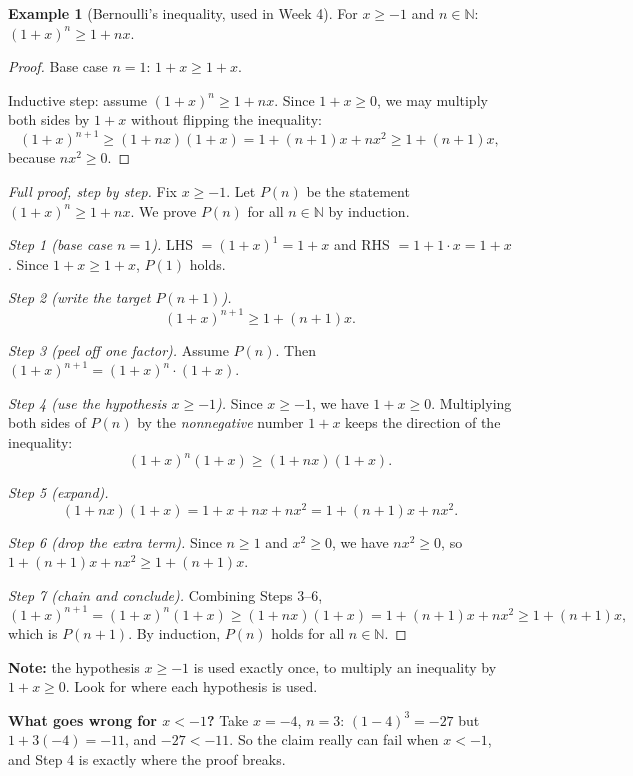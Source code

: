 \documentclass[11pt]{article}
\theoremstyle{definition}
\newtheorem{ex}[defn]{Example}
\newcommand{\N}{\mathbb{N}}
\newcommand{\key}[1]{\textcolor{red!70!black}{\textbf{#1}}}
\begin{document}
\begin{ex}[Bernoulli's inequality, used in Week 4]
For $x\ge -1$ and $n\in\N$: $(1+x)^n\ge 1+nx$.
\begin{proof}
Base case $n=1$: $1+x\ge 1+x$. \checkmark

Inductive step: assume $(1+x)^n\ge 1+nx$. Since $1+x\ge 0$, we may multiply
both sides by $1+x$ without flipping the inequality:
\[
(1+x)^{n+1}\ge(1+nx)(1+x)=1+(n+1)x+nx^2\ge 1+(n+1)x,
\]
because $nx^2\ge 0$.
\end{proof}

\begin{proof}[Full proof, step by step]
Fix $x\ge-1$. Let $P(n)$ be the statement $(1+x)^n\ge1+nx$. We prove $P(n)$
for all $n\in\N$ by induction.

\emph{Step 1 (base case $n=1$).} LHS $=(1+x)^1=1+x$ and RHS $=1+1\cdot x=1+x$.
Since $1+x\ge1+x$, $P(1)$ holds. \checkmark

\emph{Step 2 (write the target $P(n+1)$).}
\[
(1+x)^{n+1}\ge1+(n+1)x.
\]

\emph{Step 3 (peel off one factor).} Assume $P(n)$. Then
$(1+x)^{n+1}=(1+x)^n\cdot(1+x)$.

\emph{Step 4 (use the hypothesis $x\ge-1$).} Since $x\ge-1$, we have
$1+x\ge0$. Multiplying both sides of $P(n)$ by the \emph{nonnegative}
number $1+x$ keeps the direction of the inequality:
\[
(1+x)^n(1+x)\ge(1+nx)(1+x).
\]

\emph{Step 5 (expand).}
\[
(1+nx)(1+x)=1+x+nx+nx^2=1+(n+1)x+nx^2.
\]

\emph{Step 6 (drop the extra term).} Since $n\ge1$ and $x^2\ge0$, we have
$nx^2\ge0$, so $1+(n+1)x+nx^2\ge1+(n+1)x$.

\emph{Step 7 (chain and conclude).} Combining Steps 3--6,
\[
(1+x)^{n+1}=(1+x)^n(1+x)\ge(1+nx)(1+x)=1+(n+1)x+nx^2\ge1+(n+1)x,
\]
which is $P(n+1)$. By induction, $P(n)$ holds for all $n\in\N$.
\end{proof}
\noindent\key{Note:} the hypothesis $x\ge -1$ is used exactly once, to
multiply an inequality by $1+x\ge0$. Look for where each hypothesis is
used.

\noindent\key{What goes wrong for $x<-1$?} Take $x=-4$, $n=3$:
$(1-4)^3=-27$ but $1+3(-4)=-11$, and $-27<-11$. So the claim really can
fail when $x<-1$, and Step 4 is exactly where the proof breaks.
\end{ex}
\end{document}
